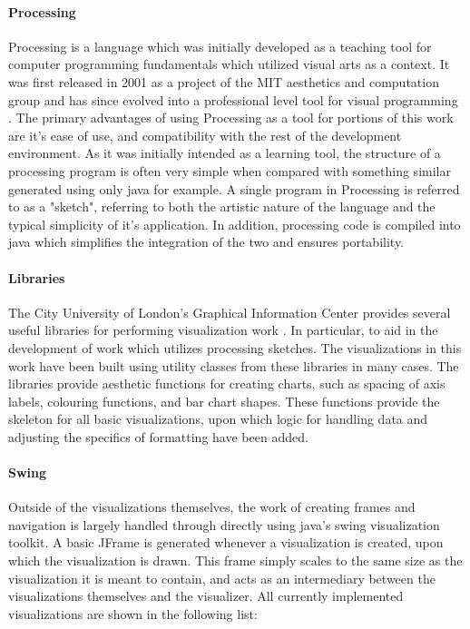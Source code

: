 \paragraph{Processing}
Processing is a language which was initially developed as a teaching tool for computer programming fundamentals which utilized visual arts as a context. It was first released in 2001 as a project of the MIT aesthetics and computation group and has since evolved into a professional level tool for visual programming \cite{Fry2015}. The primary advantages of using Processing as a tool for portions of this work are it's ease of use, and compatibility with the rest of the development environment. As it was initially intended as a learning tool, the structure of a processing program is often very simple when compared with something similar generated using only java for example. A single program in Processing is referred to as a "sketch", referring to both the artistic nature of the language and the typical simplicity of it's application. In addition, processing code is compiled into java which simplifies the integration of the two and ensures portability. 

\paragraph{Libraries}
The City University of London's Graphical Information Center provides several useful libraries for performing visualization work \cite{CityUniversityLondon2013}. In particular, to aid in the development of work which utilizes processing sketches. The visualizations in this work have been built using utility classes from these libraries in many cases. The libraries provide aesthetic functions for creating charts, such as spacing of axis labels, colouring functions, and bar chart shapes. These functions provide the skeleton for all basic visualizations, upon which logic for handling data and adjusting the specifics of formatting have been added.   

\paragraph{Swing}
Outside of the visualizations themselves, the work of creating frames and navigation is largely handled through directly using java's swing visualization toolkit. A basic JFrame is generated whenever a visualization is created, upon which the visualization is drawn. This frame simply scales to the same size as the visualization it is meant to contain, and acts as an intermediary between the visualizations themselves and the visualizer. All currently implemented visualizations are shown in the following list:
\\


